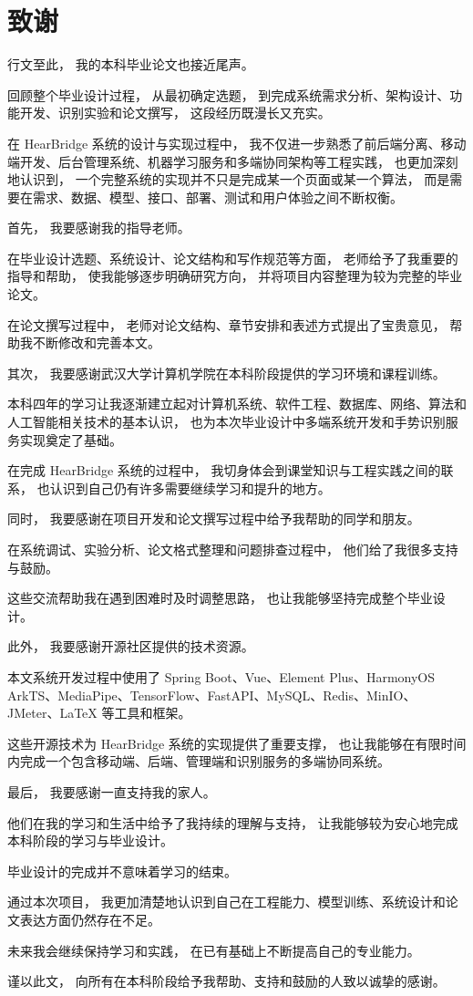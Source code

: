 ﻿%

\chapter*{致\quad 谢}

行文至此，
我的本科毕业论文也接近尾声。

回顾整个毕业设计过程，
从最初确定选题，
到完成系统需求分析、架构设计、功能开发、识别实验和论文撰写，
这段经历既漫长又充实。

在 HearBridge 系统的设计与实现过程中，
我不仅进一步熟悉了前后端分离、移动端开发、后台管理系统、机器学习服务和多端协同架构等工程实践，
也更加深刻地认识到，
一个完整系统的实现并不只是完成某一个页面或某一个算法，
而是需要在需求、数据、模型、接口、部署、测试和用户体验之间不断权衡。

首先，
我要感谢我的指导老师。

在毕业设计选题、系统设计、论文结构和写作规范等方面，
老师给予了我重要的指导和帮助，
使我能够逐步明确研究方向，
并将项目内容整理为较为完整的毕业论文。

在论文撰写过程中，
老师对论文结构、章节安排和表述方式提出了宝贵意见，
帮助我不断修改和完善本文。

其次，
我要感谢武汉大学计算机学院在本科阶段提供的学习环境和课程训练。

本科四年的学习让我逐渐建立起对计算机系统、软件工程、数据库、网络、算法和人工智能相关技术的基本认识，
也为本次毕业设计中多端系统开发和手势识别服务实现奠定了基础。

在完成 HearBridge 系统的过程中，
我切身体会到课堂知识与工程实践之间的联系，
也认识到自己仍有许多需要继续学习和提升的地方。

同时，
我要感谢在项目开发和论文撰写过程中给予我帮助的同学和朋友。

在系统调试、实验分析、论文格式整理和问题排查过程中，
他们给了我很多支持与鼓励。

这些交流帮助我在遇到困难时及时调整思路，
也让我能够坚持完成整个毕业设计。

此外，
我要感谢开源社区提供的技术资源。

本文系统开发过程中使用了 Spring Boot、Vue、Element Plus、HarmonyOS ArkTS、MediaPipe、TensorFlow、FastAPI、MySQL、Redis、MinIO、JMeter、LaTeX 等工具和框架。

这些开源技术为 HearBridge 系统的实现提供了重要支撑，
也让我能够在有限时间内完成一个包含移动端、后端、管理端和识别服务的多端协同系统。

最后，
我要感谢一直支持我的家人。

他们在我的学习和生活中给予了我持续的理解与支持，
让我能够较为安心地完成本科阶段的学习与毕业设计。

毕业设计的完成并不意味着学习的结束。

通过本次项目，
我更加清楚地认识到自己在工程能力、模型训练、系统设计和论文表达方面仍然存在不足。

未来我会继续保持学习和实践，
在已有基础上不断提高自己的专业能力。

谨以此文，
向所有在本科阶段给予我帮助、支持和鼓励的人致以诚挚的感谢。